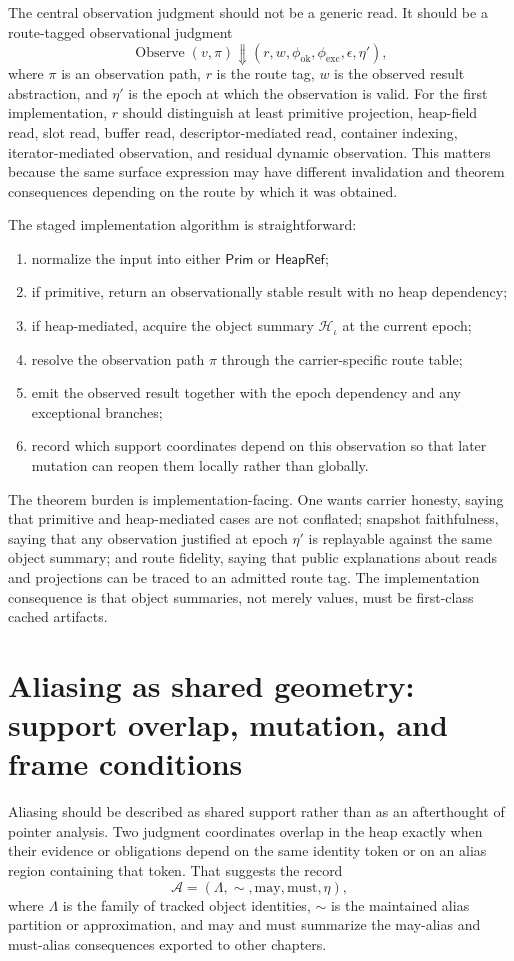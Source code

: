 \documentclass[11pt]{report}
\begin{document}
The central observation judgment should not be a generic read. It should be a route-tagged observational judgment
\[
\operatorname{Observe}(v,\pi) \Downarrow (r,w,\phi_{\mathrm{ok}},\phi_{\mathrm{exc}},\epsilon,\eta'),
\]
where $\pi$ is an observation path, $r$ is the route tag, $w$ is the observed result abstraction, and $\eta'$ is the epoch at which the observation is valid. For the first implementation, $r$ should distinguish at least primitive projection, heap-field read, slot read, buffer read, descriptor-mediated read, container indexing, iterator-mediated observation, and residual dynamic observation. This matters because the same surface expression may have different invalidation and theorem consequences depending on the route by which it was obtained.

The staged implementation algorithm is straightforward:
\begin{enumerate}
\item normalize the input into either $\mathsf{Prim}$ or $\mathsf{HeapRef}$;
\item if primitive, return an observationally stable result with no heap dependency;
\item if heap-mediated, acquire the object summary $\mathcal{H}_{\iota}$ at the current epoch;
\item resolve the observation path $\pi$ through the carrier-specific route table;
\item emit the observed result together with the epoch dependency and any exceptional branches;
\item record which support coordinates depend on this observation so that later mutation can reopen them locally rather than globally.
\end{enumerate}

The theorem burden is implementation-facing. One wants carrier honesty, saying that primitive and heap-mediated cases are not conflated; snapshot faithfulness, saying that any observation justified at epoch $\eta'$ is replayable against the same object summary; and route fidelity, saying that public explanations about reads and projections can be traced to an admitted route tag. The implementation consequence is that object summaries, not merely values, must be first-class cached artifacts.
\section{Aliasing as shared geometry: support overlap, mutation, and frame conditions}
Aliasing should be described as shared support rather than as an afterthought of pointer analysis. Two judgment coordinates overlap in the heap exactly when their evidence or obligations depend on the same identity token or on an alias region containing that token. That suggests the record
\[
\mathcal{A} = (\Lambda,\sim,\mathrm{may},\mathrm{must},\eta),
\]
where $\Lambda$ is the family of tracked object identities, $\sim$ is the maintained alias partition or approximation, and $\mathrm{may}$ and $\mathrm{must}$ summarize the may-alias and must-alias consequences exported to other chapters.
\end{document}
